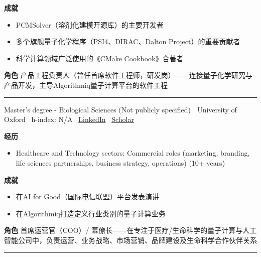 \par{\footnotesize\color{mainred}\textbf{成就}}
\begin{itemize}[leftmargin=1.2em,itemsep=0pt,topsep=0pt]
\item {\footnotesize PCMSolver（溶剂化建模开源库）的主要开发者}
\item {\footnotesize 多个旗舰量子化学程序（PSI4、DIRAC、Dalton Project）的重要贡献者}
\item {\footnotesize 科学计算领域广泛使用的《CMake Cookbook》合著者}
\end{itemize}
\par{\footnotesize\color{mainred}\textbf{角色}} {\footnotesize 产品工程负责人（曾任首席软件工程师，研发岗）——连接量子化学研究与产品开发，主导Algorithmiq量子计算平台的软件工程}
\vspace{2pt}\hrule\vspace{2pt}
\vspace{4pt}
\par{\footnotesize\color{graytext}Master's degree - Biological Sciences (Not publicly specified) | University of Oxford \textbar\  h-index: N/A \textbar\  \href{https://www.linkedin.com/in/kirstennehr/}{LinkedIn} \textbar\  \href{N/A}{Scholar}}
\par{\footnotesize\color{mainred}\textbf{经历}}
\begin{itemize}[leftmargin=1.2em,itemsep=0pt,topsep=0pt]
\item {\footnotesize Healthcare and Technology sectors: Commercial roles (marketing, branding, life sciences partnerships, business strategy, operations) (10+ years)}
\end{itemize}
\par{\footnotesize\color{mainred}\textbf{成就}}
\begin{itemize}[leftmargin=1.2em,itemsep=0pt,topsep=0pt]
\item {\footnotesize 在AI for Good（国际电信联盟）平台发表演讲}
\item {\footnotesize 在Algorithmiq打造定义行业类别的量子计算业务}
\end{itemize}
\par{\footnotesize\color{mainred}\textbf{角色}} {\footnotesize 首席运营官（COO）/ 幕僚长——在专注于医疗/生命科学的量子计算与人工智能公司中，负责运营、业务战略、市场营销、品牌建设及生命科学合作伙伴关系}
\vspace{2pt}\hrule\vspace{2pt}
\vspace{4pt}
